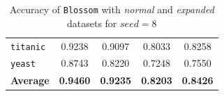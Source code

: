 \documentclass[12pt]{report}
\theoremstyle{definition}
\theoremstyle{definition}
\theoremstyle{definition}
\begin{document}
\begin{table}[ht]
\begin{tabular}{lcccc}
    \multicolumn{1}{l}{\tt titanic}       & \multicolumn{1}{c}{0.9238} & \multicolumn{1}{c}{0.9097} & \multicolumn{1}{c}{0.8033} & \multicolumn{1}{c}{0.8258} \\
    \multicolumn{1}{l}{\tt yeast}         & \multicolumn{1}{c}{0.8743} & \multicolumn{1}{c}{0.8220} & \multicolumn{1}{c}{0.7248} & \multicolumn{1}{c}{0.7550} \\
    \hline
    \multicolumn{1}{l}{\bf Average}       & \multicolumn{1}{c}{\bf 0.9460} & \multicolumn{1}{c}{\bf 0.9235} & \multicolumn{1}{c}{\bf 0.8203} & \multicolumn{1}{c}{\bf 0.8426} \\
    \hline
    \end{tabular}
    \caption{Accuracy of \texttt{Blossom} with \textit{normal} and \textit{expanded} datasets for $seed=8$}
    \label{fig:seed8}
\end{table}
\end{document}
